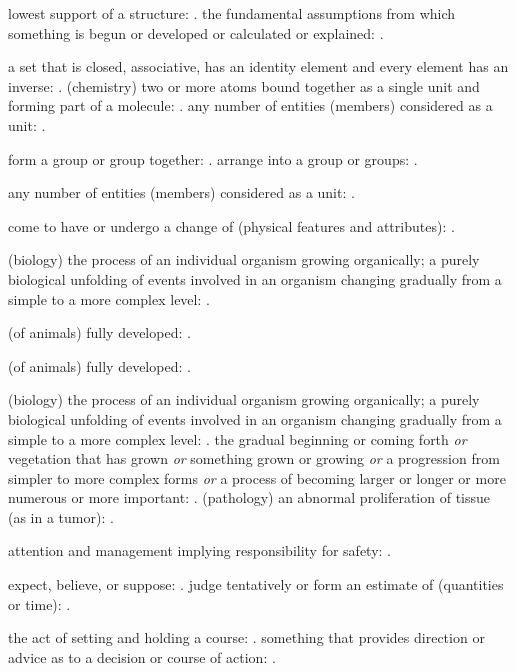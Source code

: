   lowest support of a structure: . the fundamental assumptions from which something is begun or developed or calculated or explained: .

  a set that is closed, associative, has an identity element and every element has an inverse: . (chemistry) two or more atoms bound together as a single unit and forming part of a molecule: . any number of entities (members) considered as a unit: .

  form a group or group together: . arrange into a group or groups: .

  any number of entities (members) considered as a unit: .

  come to have or undergo a change of (physical features and attributes): .

  (biology) the process of an individual organism growing organically; a purely biological unfolding of events involved in an organism changing gradually from a simple to a more complex level: .

  (of animals) fully developed: .

  (of animals) fully developed: .

  (biology) the process of an individual organism growing organically; a purely biological unfolding of events involved in an organism changing gradually from a simple to a more complex level: . the gradual beginning or coming forth \textit{or} vegetation that has grown \textit{or} something grown or growing \textit{or} a progression from simpler to more complex forms \textit{or} a process of becoming larger or longer or more numerous or more important: . (pathology) an abnormal proliferation of tissue (as in a tumor): .

  attention and management implying responsibility for safety: .

  expect, believe, or suppose: . judge tentatively or form an estimate of (quantities or time): .

  the act of setting and holding a course: . something that provides direction or advice as to a decision or course of action: .

